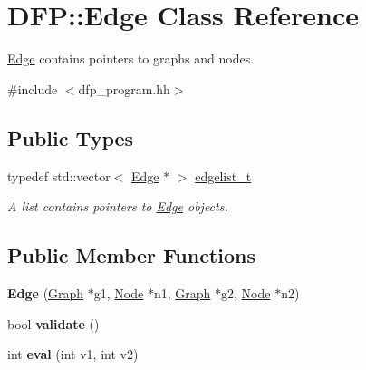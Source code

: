 \hypertarget{class_d_f_p_1_1_edge}{}\section{D\+FP\+:\+:Edge Class Reference}
\label{class_d_f_p_1_1_edge}


\hyperlink{class_d_f_p_1_1_edge}{Edge} contains pointers to graphs and nodes.  




{\ttfamily \#include $<$dfp\+\_\+program.\+hh$>$}

\subsection*{Public Types}
\begin{DoxyCompactItemize}
\item 
typedef std\+::vector$<$ \hyperlink{class_d_f_p_1_1_edge}{Edge} $\ast$ $>$ \hyperlink{class_d_f_p_1_1_edge_a71ccd1900dbfda5591981064738f60af}{edgelist\+\_\+t}\hypertarget{class_d_f_p_1_1_edge_a71ccd1900dbfda5591981064738f60af}{}\label{class_d_f_p_1_1_edge_a71ccd1900dbfda5591981064738f60af}

\begin{DoxyCompactList}\small\item\em A list contains pointers to \hyperlink{class_d_f_p_1_1_edge}{Edge} objects. \end{DoxyCompactList}\end{DoxyCompactItemize}
\subsection*{Public Member Functions}
\begin{DoxyCompactItemize}
\item 
{\bfseries Edge} (\hyperlink{class_d_f_p_1_1_graph}{Graph} $\ast$g1, \hyperlink{class_d_f_p_1_1_node}{Node} $\ast$n1, \hyperlink{class_d_f_p_1_1_graph}{Graph} $\ast$g2, \hyperlink{class_d_f_p_1_1_node}{Node} $\ast$n2)\hypertarget{class_d_f_p_1_1_edge_a31c5aa0ea975790932d13a18ec6d84ee}{}\label{class_d_f_p_1_1_edge_a31c5aa0ea975790932d13a18ec6d84ee}

\item 
bool {\bfseries validate} ()\hypertarget{class_d_f_p_1_1_edge_a83b1d1a1a421b79d9a181ff4e3e21ecb}{}\label{class_d_f_p_1_1_edge_a83b1d1a1a421b79d9a181ff4e3e21ecb}

\item 
int {\bfseries eval} (int v1, int v2)\hypertarget{class_d_f_p_1_1_edge_ac142939aa6aa05c7ee0713b33af9639e}{}\label{class_d_f_p_1_1_edge_ac142939aa6aa05c7ee0713b33af9639e}

\end{DoxyCompactItemize}
